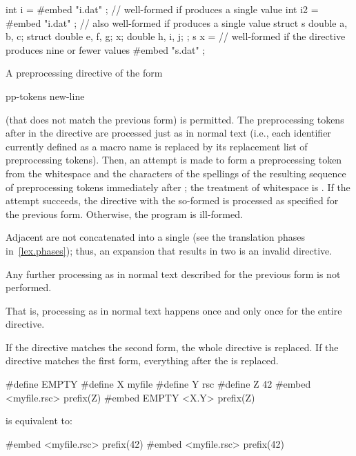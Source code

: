 \begin{example}
\begin{codeblock}
int i = {
#embed "i.dat"
};  // well-formed if  produces a single value
int i2 =
#embed "i.dat"
;   // also well-formed if  produces a single value
struct s {
  double a, b, c;
  struct { double e, f, g; } x;
  double h, i, j;
};
s x = {
// well-formed if the directive produces nine or fewer values
#embed "s.dat"
};
\end{codeblock}
\end{example}

\pnum
A preprocessing directive of the form
\begin{ncsimplebnf}
 pp-tokens new-line
\end{ncsimplebnf}
(that does not match the previous form) is permitted.
The preprocessing tokens after  in the directive are processed
just as in normal text (i.e., each identifier currently defined as a macro
name is replaced by its replacement list of preprocessing tokens).
Then, an attempt is made to form a 
preprocessing token from the whitespace and the characters
of the spellings of the resulting sequence of preprocessing tokens immediately after ;
the treatment of whitespace
is .
If the attempt succeeds, the directive with the so-formed 
is processed as specified for the previous form.
Otherwise, the program is ill-formed.
\begin{note}
Adjacent  are not concatenated into a single
 (see the translation phases in~\ref{lex.phases});
thus, an expansion that results in two  is an
invalid directive.
\end{note}
Any further processing as in normal text described for the previous
form is not performed.
\begin{note}
That is, processing as in normal text happens once and only once for the entire
directive.
\end{note}
\begin{example}
If the directive matches the second form, the whole directive is replaced.
If the directive matches the first form, everything after the  is replaced.
\begin{codeblock}
#define EMPTY
#define X myfile
#define Y rsc
#define Z 42
#embed <myfile.rsc> prefix(Z)
#embed EMPTY <X.Y>  prefix(Z)
\end{codeblock}
is equivalent to:
\begin{codeblock}
#embed <myfile.rsc> prefix(42)
#embed <myfile.rsc> prefix(42)
\end{codeblock}
\end{example}


